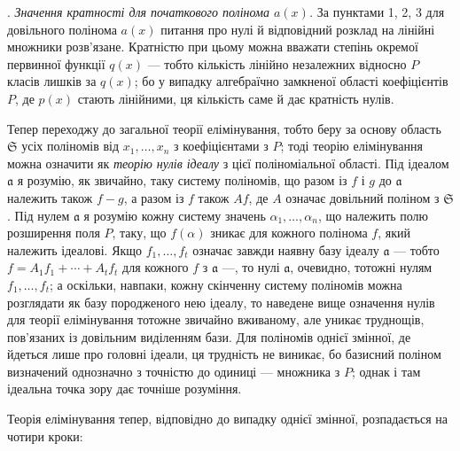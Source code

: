 \documentclass[11pt]{article}
\providecommand{\fraka}{\mathfrak a}
\providecommand{\frakS}{\mathfrak S}
\begin{document}
. \emph{Значення кратності для початкового полінома $a(x)$.} За пунктами 1, 2, 3 для довільного полінома $a(x)$ питання про нулі й відповідний розклад на лінійні множники розв'язане. Кратністю при цьому можна вважати степінь окремої первинної функції $q(x)$ --- тобто кількість лінійно незалежних відносно $P$ класів лишків за $q(x)$; бо у випадку алгебраїчно замкненої області коефіцієнтів $P$, де $p(x)$ стають лінійними, ця кількість саме й дає кратність нулів.

Тепер переходжу до загальної теорії елімінування, тобто беру за основу область $\frakS$ усіх поліномів від $x_1,\ldots,x_n$ з коефіцієнтами з $P$; тоді теорію елімінування можна означити як \emph{теорію нулів ідеалу} з цієї поліноміальної області. Під ідеалом $\fraka$ я розумію, як звичайно, таку систему поліномів, що разом із $f$ і $g$ до $\fraka$ належить також $f-g$, а разом із $f$ також $Af$, де $A$ означає довільний поліном з $\frakS$. Під нулем $\fraka$ я розумію кожну систему значень $\alpha_1,\ldots,\alpha_n$, що належить полю розширення поля $P$, таку, що $f(\alpha)$ зникає для кожного полінома $f$, який належить ідеалові. Якщо $f_1,\ldots,f_t$ означає завжди наявну базу ідеалу $\fraka$ --- тобто $f=A_1f_1+\cdots+A_tf_t$ для кожного $f$ з $\fraka$ ---, то нулі $\fraka$, очевидно, тотожні нулям $f_1,\ldots,f_t$; а оскільки, навпаки, кожну скінченну систему поліномів можна розглядати як базу породженого нею ідеалу, то наведене вище означення нулів для теорії елімінування тотожне звичайно вживаному, але уникає труднощів, пов'язаних із довільним виділенням бази. Для поліномів однієї змінної, де йдеться лише про головні ідеали, ця трудність не виникає, бо базисний поліном визначений однозначно з точністю до одиниці --- множника з $P$; однак і там ідеальна точка зору дає точніше розуміння.

Теорія елімінування тепер, відповідно до випадку однієї змінної, розпадається на чотири кроки:
\end{document}
